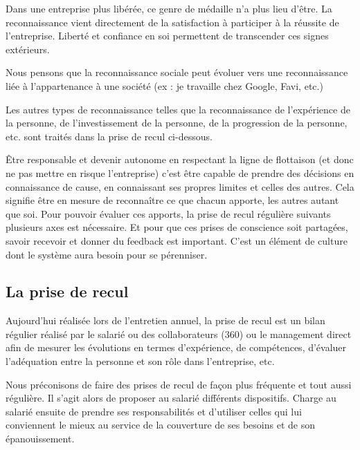 \documentclass[12pt]{article}
\begin{document}
 Dans une entreprise plus libérée, ce genre de médaille n’a plus lieu d’être. La reconnaissance vient directement de la satisfaction à participer à la réussite de l’entreprise. Liberté et confiance en soi permettent de transcender ces signes extérieurs. 

 Nous pensons que la reconnaissance sociale peut évoluer vers une reconnaissance liée à l’appartenance à une société  (ex : je travaille chez Google, Favi, etc.)

 Les autres types de reconnaissance telles que la reconnaissance de l’expérience de la personne, de l’investissement de la personne, de la progression de la personne, etc. sont traités dans la prise de recul ci-dessous. 

 Être responsable et devenir autonome en respectant la ligne de flottaison (et donc ne pas mettre en risque l’entreprise) c’est être capable de prendre des décisions en connaissance de cause, en connaissant ses propres limites et celles des autres. Cela signifie être en mesure de reconnaître ce que chacun apporte, les autres autant que soi. Pour pouvoir évaluer ces apports, la prise de recul régulière suivants plusieurs axes est nécessaire. Et pour que ces prises de conscience soit partagées, savoir recevoir et donner du feedback est important. C’est un élément de culture dont le système aura besoin pour se pérenniser.

\subsection{La prise de recul}

 Aujourd’hui réalisée lors de l’entretien annuel, la prise de recul est un bilan régulier réalisé par le salarié ou des collaborateurs (360\degre) ou le management direct afin de mesurer les évolutions en termes d’expérience, de compétences, d’évaluer l’adéquation entre la personne et son rôle dans l’entreprise, etc.

 Nous préconisons de faire des prises de recul de façon plus fréquente et tout aussi régulière. Il s’agit alors de proposer au salarié différents dispositifs. Charge au salarié ensuite de prendre ses responsabilités et d’utiliser celles qui lui conviennent le mieux au service de la couverture de ses besoins et de son épanouissement. 
\end{document}
